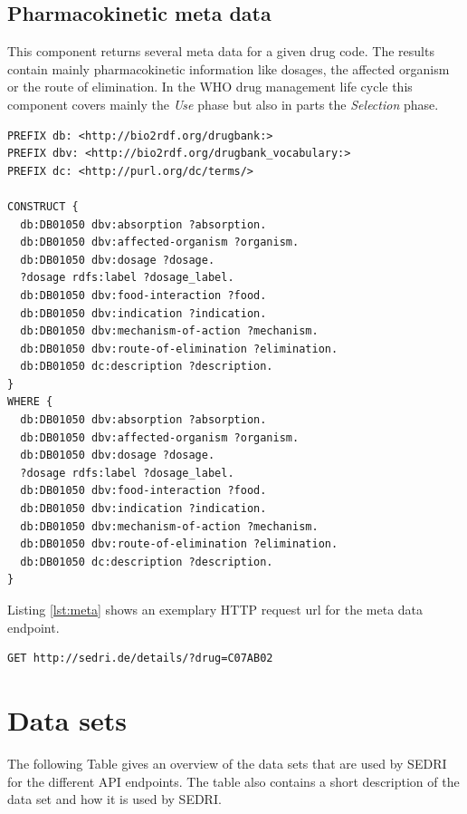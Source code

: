 \subsection*{Pharmacokinetic meta data}
This component returns several meta data for a given drug code.
The results contain mainly pharmacokinetic information like dosages, the affected organism or the route of elimination.
In the WHO drug management life cycle this component covers mainly the \textit{Use} phase but also in parts the \textit{Selection} phase.

\begin{lstlisting}[caption=Example Diseasome query for possible drugs of Hypertension,label=lst:diseasome]
PREFIX db: <http://bio2rdf.org/drugbank:>
PREFIX dbv: <http://bio2rdf.org/drugbank_vocabulary:>
PREFIX dc: <http://purl.org/dc/terms/>

CONSTRUCT {
  db:DB01050 dbv:absorption ?absorption.
  db:DB01050 dbv:affected-organism ?organism.
  db:DB01050 dbv:dosage ?dosage.
  ?dosage rdfs:label ?dosage_label.
  db:DB01050 dbv:food-interaction ?food.
  db:DB01050 dbv:indication ?indication.
  db:DB01050 dbv:mechanism-of-action ?mechanism.
  db:DB01050 dbv:route-of-elimination ?elimination.
  db:DB01050 dc:description ?description.
}
WHERE {
  db:DB01050 dbv:absorption ?absorption.
  db:DB01050 dbv:affected-organism ?organism.
  db:DB01050 dbv:dosage ?dosage.
  ?dosage rdfs:label ?dosage_label.
  db:DB01050 dbv:food-interaction ?food.
  db:DB01050 dbv:indication ?indication.
  db:DB01050 dbv:mechanism-of-action ?mechanism.
  db:DB01050 dbv:route-of-elimination ?elimination.
  db:DB01050 dc:description ?description.
}
\end{lstlisting}
Listing \ref{lst:meta} shows an exemplary HTTP request url for the meta data endpoint.
\begin{lstlisting}[label=lst:meta,caption=Example request for the meta data endpoint]
  GET http://sedri.de/details/?drug=C07AB02
\end{lstlisting}

\newpage
\section{Data sets}
\label{sec:data-sets}

The following Table gives an overview of the data sets that are used by SEDRI for the different API endpoints.
The table also contains a short description of the data set and how it is used by SEDRI.

